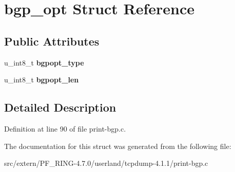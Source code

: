 \hypertarget{structbgp__opt}{
\section{bgp\_\-opt Struct Reference}
\label{structbgp__opt}
}
\subsection*{Public Attributes}
\begin{DoxyCompactItemize}
\item 
\hypertarget{structbgp__opt_a97b202ee7407628c8fdca787fa5a6958}{
u\_\-int8\_\-t {\bfseries bgpopt\_\-type}}
\label{structbgp__opt_a97b202ee7407628c8fdca787fa5a6958}

\item 
\hypertarget{structbgp__opt_a3ab352fa9323166ed177285e6fcf3361}{
u\_\-int8\_\-t {\bfseries bgpopt\_\-len}}
\label{structbgp__opt_a3ab352fa9323166ed177285e6fcf3361}

\end{DoxyCompactItemize}


\subsection{Detailed Description}


Definition at line 90 of file print-\/bgp.c.



The documentation for this struct was generated from the following file:\begin{DoxyCompactItemize}
\item 
src/extern/PF\_\-RING-\/4.7.0/userland/tcpdump-\/4.1.1/print-\/bgp.c\end{DoxyCompactItemize}
